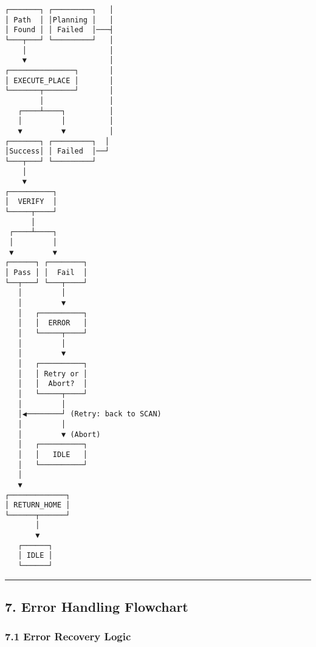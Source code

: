 \documentclass[
]{article}
\begin{document}
\begin{verbatim}
┌───────┐ ┌─────────┐   │
│ Path  │ │Planning │   │
│ Found │ │ Failed  │───┤
└───┬───┘ └─────────┘   │
    │                   │
    ▼                   │
┌───────────────┐       │
│ EXECUTE_PLACE │       │
└───────┬───────┘       │
        │               │
   ┌────┴────┐          │
   │         │          │
   ▼         ▼          │
┌───────┐ ┌─────────┐  │
│Success│ │ Failed  │──┘
└───┬───┘ └─────────┘
    │
    ▼
┌──────────┐
│  VERIFY  │
└─────┬────┘
      │
 ┌────┴────┐
 │         │
 ▼         ▼
┌──────┐ ┌────────┐
│ Pass │ │  Fail  │
└──┬───┘ └───┬────┘
   │         │
   │         ▼
   │   ┌──────────┐
   │   │  ERROR   │
   │   └─────┬────┘
   │         │
   │         ▼
   │   ┌──────────┐
   │   │ Retry or │
   │   │  Abort?  │
   │   └─────┬────┘
   │         │
   │◀────────┘ (Retry: back to SCAN)
   │         │
   │         ▼ (Abort)
   │   ┌──────────┐
   │   │   IDLE   │
   │   └──────────┘
   │
   ▼
┌─────────────┐
│ RETURN_HOME │
└──────┬──────┘
       │
       ▼
   ┌──────┐
   │ IDLE │
   └──────┘
\end{verbatim}

\begin{center}\rule{0.5\linewidth}{0.5pt}\end{center}

\hypertarget{error-handling-flowchart}{%
\subsection{7. Error Handling
Flowchart}\label{error-handling-flowchart}}

\hypertarget{error-recovery-logic}{%
\subsubsection{7.1 Error Recovery Logic}\label{error-recovery-logic}}
\end{document}
